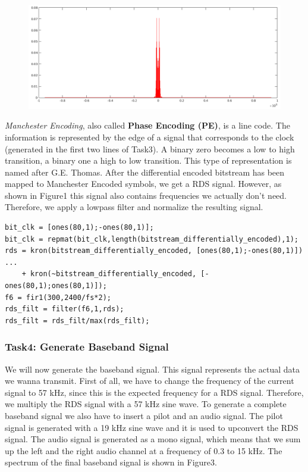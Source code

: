 \documentclass[sigconf]{acmart}
\begin{document}
\begin{figure}[tb!]
	\includegraphics[width=1\linewidth]{rds_filt_plot.png}
	\caption{}
	\label{fig:rds_filt_plot}
\end{figure}

\emph{Manchester Encoding}, also called
\protect\hypertarget{Phaseux20Encodingux20ux28PEux29}{}{}\textbf{Phase
Encoding (PE)}, is a line code. The information is represented by the
edge of a signal that corresponds to the clock (generated in the first
two lines of Task3). A binary zero becomes a low to high transition, a
binary one a high to low transition. This type of representation is
named after G.E. Thomas. After the differential encoded bitstream has
been mapped to Manchester Encoded symbols, we get a RDS signal. However,
as shown in Figure1 this signal also contains frequencies we actually
don't need. Therefore, we apply a lowpass filter and normalize the
resulting signal.

\begin{verbatim}
bit_clk = [ones(80,1);-ones(80,1)];
bit_clk = repmat(bit_clk,length(bitstream_differentially_encoded),1);
rds = kron(bitstream_differentially_encoded, [ones(80,1);-ones(80,1)]) ...
    + kron(~bitstream_differentially_encoded, [-ones(80,1);ones(80,1)]);
f6 = fir1(300,2400/fs*2);
rds_filt = filter(f6,1,rds);
rds_filt = rds_filt/max(rds_filt);
\end{verbatim}

\hypertarget{Task4:ux20Generateux20Basebandux20Signal}{%
\subsubsection{Task4: Generate Baseband
Signal}\label{Task4:ux20Generateux20Basebandux20Signal}}

We will now generate the baseband signal. This signal represents the
actual data we wanna transmit. First of all, we have to change the
frequency of the current signal to 57 kHz, since this is the expected
frequency for a RDS signal. Therefore, we multiply the RDS signal with a
57 kHz sine wave. To generate a complete baseband signal we also have to
insert a pilot and an audio signal. The pilot signal is generated with a
19 kHz sine wave and it is used to upconvert the RDS signal. The audio
signal is generated as a mono signal, which means that we sum up the
left and the right audio channel at a frequency of 0.3 to 15 kHz. The
spectrum of the final baseband signal is shown in Figure3.
\end{document}
